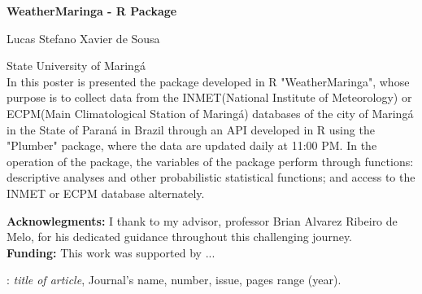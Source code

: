 \documentclass{article}
\begin{document}
\thispagestyle{empty}
\newcommand{\titulo}[1]{{\large\bf #1}}
\newcommand{\nome}[1]{{\large #1}}
\newcommand{\instituicao}[1]{#1}
\newcommand{\resumo}[1]{#1}
\newcommand{\ack}[1]{\textbf{Acknowlegments:} #1}
\newcommand{\funding}[1]{\textbf{Funding:} #1}

\renewcommand{\refname}{\normalsize References}

\noindent
\titulo{WeatherMaringa - R Package}

\bigskip

\noindent
\nome{Lucas Stefano Xavier de Sousa}\\
\noindent

\noindent
\instituicao{State University of Maringá}\\


\noindent
\resumo{\newline 
In this poster is presented the package developed in R "WeatherMaringa", 
whose purpose is to collect data from the INMET(National Institute of Meteorology) or 
ECPM(Main Climatological Station of Maringá) databases of the city of Maringá 
in the State of Paraná in Brazil through an API developed in R using 
the "Plumber" package, where the data are updated daily at 11:00 PM. 
In the operation of the package, the variables of the package 
perform through functions: descriptive analyses and other 
probabilistic statistical functions; and access to the INMET or ECPM database 
alternately.
}\\

\bigskip

\noindent
\ack{I thank to my advisor, professor Brian Alvarez Ribeiro de Melo, 
for his dedicated guidance throughout this challenging journey.}\\

 
\noindent
\funding{This work was  supported by ... }


\begin{thebibliography}{99}%
\normalsize
{} {}: {\it title of article}, { Journal's name, number, issue, pages range (year).}

\end{thebibliography}
\end{document}
